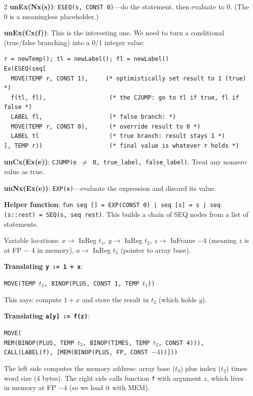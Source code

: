\documentclass[9pt,landscape]{extarticle}
\begin{document}
\begin{multicols}{2}
\textbf{unEx(Nx(s))}: \texttt{ESEQ(s, CONST 0)}---do the statement, then evaluate to 0. (The 0 is a meaningless placeholder.)

\textbf{unEx(Cx(f))}: This is the interesting one. We need to turn a conditional (true/false branching) into a 0/1 integer value:
\begin{lstlisting}
r = newTemp(); tl = newLabel(); fl = newLabel()
Ex(ESEQ(seq[
  MOVE(TEMP r, CONST 1),     (* optimistically set result to 1 (true) *)
  f(tl, fl),                  (* the CJUMP: go to tl if true, fl if false *)
  LABEL fl,                   (* false branch: *)
  MOVE(TEMP r, CONST 0),      (* override result to 0 *)
  LABEL tl                    (* true branch: result stays 1 *)
], TEMP r))                   (* final value is whatever r holds *)
\end{lstlisting}

\textbf{unCx(Ex(e))}: \texttt{CJUMP(e $\neq$ 0, true\_label, false\_label)}. Treat any nonzero value as true.

\textbf{unNx(Ex(e))}: \texttt{EXP(e)}---evaluate the expression and discard its value.

\textbf{Helper function}: \texttt{fun seq [] = EXP(CONST 0) | seq [s] = s | seq (s::rest) = SEQ(s, seq rest)}. This builds a chain of SEQ nodes from a list of statements.

\begin{exambox}
Variable locations: $x \to$ InReg $t_1$, $y \to$ InReg $t_2$, $z \to$ InFrame $-4$ (meaning $z$ is at FP $-$ 4 in memory), $a \to$ InReg $t_3$ (pointer to array base).

\textbf{Translating \texttt{y := 1 + x}}:

\texttt{MOVE(TEMP $t_2$, BINOP(PLUS, CONST 1, TEMP $t_1$))}

This says: compute $1 + x$ and store the result in $t_2$ (which holds $y$).

\textbf{Translating \texttt{a[y] := f(z)}}:

\texttt{MOVE(}\\
\quad\texttt{MEM(BINOP(PLUS, TEMP $t_3$, BINOP(TIMES, TEMP $t_2$, CONST 4))),}\\
\quad\texttt{CALL(LABEL(f), [MEM(BINOP(PLUS, FP, CONST $-4$))]))}

The left side computes the memory address: array base ($t_3$) plus index ($t_2$) times word size (4 bytes). The right side calls function \texttt{f} with argument $z$, which lives in memory at FP $- 4$ (so we load it with MEM).


\end{exambox}
\end{multicols}
\end{document}
